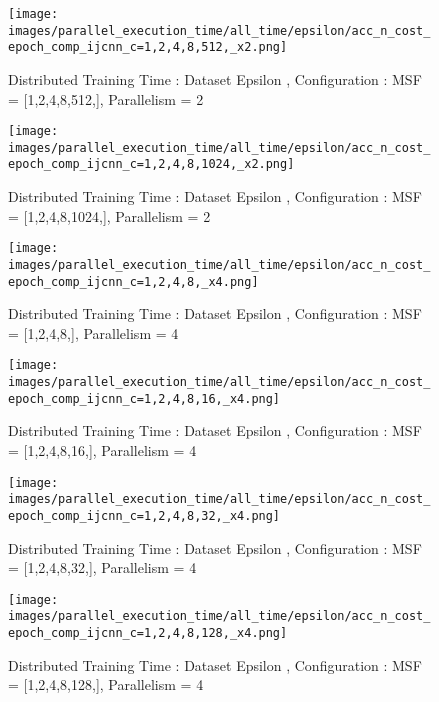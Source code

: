 \begin{figure*}[htbp]
\centering
\texttt{[image: images/parallel\_execution\_time/all\_time/epsilon/acc\_n\_cost\_epoch\_comp\_ijcnn\_c=1,2,4,8,512,\_x2.png]}
\caption{Distributed Training Time : Dataset Epsilon , Configuration : MSF = [1,2,4,8,512,], Parallelism = 2}
\label{fig:dis-msf-tr-time-epsilon-x2}
\end{figure*}


\begin{figure*}[htbp]
\centering
\texttt{[image: images/parallel\_execution\_time/all\_time/epsilon/acc\_n\_cost\_epoch\_comp\_ijcnn\_c=1,2,4,8,1024,\_x2.png]}
\caption{Distributed Training Time : Dataset Epsilon , Configuration : MSF = [1,2,4,8,1024,], Parallelism = 2}
\label{fig:dis-msf-tr-time-epsilon-x2}
\end{figure*}


\begin{figure*}[htbp]
\centering
\texttt{[image: images/parallel\_execution\_time/all\_time/epsilon/acc\_n\_cost\_epoch\_comp\_ijcnn\_c=1,2,4,8,\_x4.png]}
\caption{Distributed Training Time : Dataset Epsilon , Configuration : MSF = [1,2,4,8,], Parallelism = 4}
\label{fig:dis-msf-tr-time-epsilon-x4}
\end{figure*}


\begin{figure*}[htbp]
\centering
\texttt{[image: images/parallel\_execution\_time/all\_time/epsilon/acc\_n\_cost\_epoch\_comp\_ijcnn\_c=1,2,4,8,16,\_x4.png]}
\caption{Distributed Training Time : Dataset Epsilon , Configuration : MSF = [1,2,4,8,16,], Parallelism = 4}
\label{fig:dis-msf-tr-time-epsilon-x4}
\end{figure*}


\begin{figure*}[htbp]
\centering
\texttt{[image: images/parallel\_execution\_time/all\_time/epsilon/acc\_n\_cost\_epoch\_comp\_ijcnn\_c=1,2,4,8,32,\_x4.png]}
\caption{Distributed Training Time : Dataset Epsilon , Configuration : MSF = [1,2,4,8,32,], Parallelism = 4}
\label{fig:dis-msf-tr-time-epsilon-x4}
\end{figure*}


\begin{figure*}[htbp]
\centering
\texttt{[image: images/parallel\_execution\_time/all\_time/epsilon/acc\_n\_cost\_epoch\_comp\_ijcnn\_c=1,2,4,8,128,\_x4.png]}
\caption{Distributed Training Time : Dataset Epsilon , Configuration : MSF = [1,2,4,8,128,], Parallelism = 4}
\label{fig:dis-msf-tr-time-epsilon-x4}
\end{figure*}


